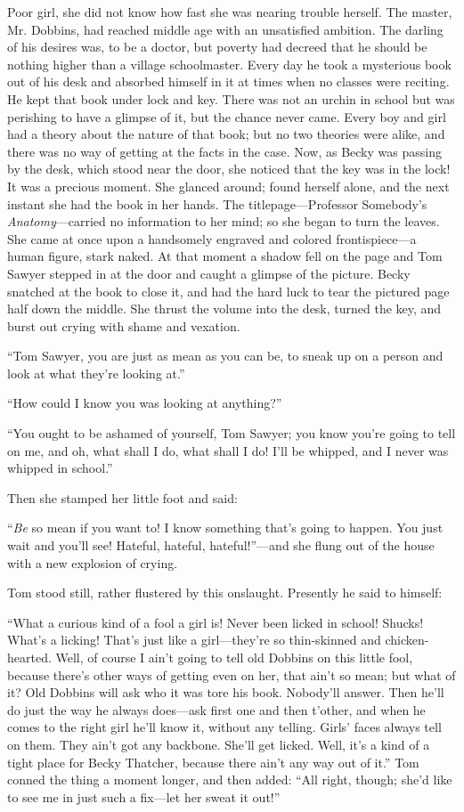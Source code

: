 \documentclass{book}
\begin{document}
Poor girl, she did not know how fast she was nearing trouble herself. The master, Mr. Dobbins, had reached middle age with an unsatisfied ambition. The darling of his desires was, to be a doctor, but poverty had decreed that he should be nothing higher than a village schoolmaster. Every day he took a mysterious book out of his desk and absorbed himself in it at times when no classes were reciting. He kept that book under lock and key. There was not an urchin in school but was perishing to have a glimpse of it, but the chance never came. Every boy and girl had a theory about the nature of that book; but no two theories were alike, and there was no way of getting at the facts in the case. Now, as Becky was passing by the desk, which stood near the door, she noticed that the key was in the lock! It was a precious moment. She glanced around; found herself alone, and the next instant she had the book in her hands. The titlepage—Professor Somebody’s \emph{Anatomy}—carried no information to her mind; so she began to turn the leaves. She came at once upon a handsomely engraved and colored frontispiece—a human figure, stark naked. At that moment a shadow fell on the page and Tom Sawyer stepped in at the door and caught a glimpse of the picture. Becky snatched at the book to close it, and had the hard luck to tear the pictured page half down the middle. She thrust the volume into the desk, turned the key, and burst out crying with shame and vexation.

“Tom Sawyer, you are just as mean as you can be, to sneak up on a person and look at what they’re looking at.”

“How could I know you was looking at anything?”

“You ought to be ashamed of yourself, Tom Sawyer; you know you’re going to tell on me, and oh, what shall I do, what shall I do! I’ll be whipped, and I never was whipped in school.”

Then she stamped her little foot and said:

“\emph{Be} so mean if you want to! I know something that’s going to happen. You just wait and you’ll see! Hateful, hateful, hateful!”—and she flung out of the house with a new explosion of crying.

Tom stood still, rather flustered by this onslaught. Presently he said to himself:

“What a curious kind of a fool a girl is! Never been licked in school! Shucks! What’s a licking! That’s just like a girl—they’re so thin-skinned and chicken-hearted. Well, of course I ain’t going to tell old Dobbins on this little fool, because there’s other ways of getting even on her, that ain’t so mean; but what of it? Old Dobbins will ask who it was tore his book. Nobody’ll answer. Then he’ll do just the way he always does—ask first one and then t’other, and when he comes to the right girl he’ll know it, without any telling. Girls’ faces always tell on them. They ain’t got any backbone. She’ll get licked. Well, it’s a kind of a tight place for Becky Thatcher, because there ain’t any way out of it.” Tom conned the thing a moment longer, and then added: “All right, though; she’d like to see me in just such a fix—let her sweat it out!”
\end{document}

